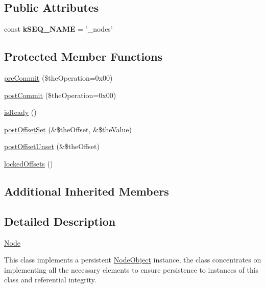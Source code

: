 \subsection*{Public Attributes}
\begin{DoxyCompactItemize}
\item 
\hypertarget{class_ontology_wrapper_1_1_node_a17c5f694f51baf3410f6416753117521}{const {\bfseries k\-S\-E\-Q\-\_\-\-N\-A\-M\-E} = '\-\_\-nodes'}\label{class_ontology_wrapper_1_1_node_a17c5f694f51baf3410f6416753117521}

\end{DoxyCompactItemize}
\subsection*{Protected Member Functions}
\begin{DoxyCompactItemize}
\item 
\hyperlink{class_ontology_wrapper_1_1_node_a631f706a3a7f62fc5f1f75f42e5889e8}{pre\-Commit} (\$the\-Operation=0x00)
\item 
\hyperlink{class_ontology_wrapper_1_1_node_af777a6809d020b9ef64582373776a778}{post\-Commit} (\$the\-Operation=0x00)
\item 
\hyperlink{class_ontology_wrapper_1_1_node_af513e1e79f8c7dd360a3adb4265b315e}{is\-Ready} ()
\item 
\hyperlink{class_ontology_wrapper_1_1_node_ab8bf8f281ec784217a001a55b265ddfc}{post\-Offset\-Set} (\&\$the\-Offset, \&\$the\-Value)
\item 
\hyperlink{class_ontology_wrapper_1_1_node_ae5c0530b5499cdb995278fd63184a38a}{post\-Offset\-Unset} (\&\$the\-Offset)
\item 
\hyperlink{class_ontology_wrapper_1_1_node_aea89165149368db575c3da6fd4279785}{locked\-Offsets} ()
\end{DoxyCompactItemize}
\subsection*{Additional Inherited Members}


\subsection{Detailed Description}
\hyperlink{class_ontology_wrapper_1_1_node}{Node}

This class implements a persistent \hyperlink{class_ontology_wrapper_1_1_node_object}{Node\-Object} instance, the class concentrates on implementing all the necessary elements to ensure persistence to instances of this class and referential integrity.

